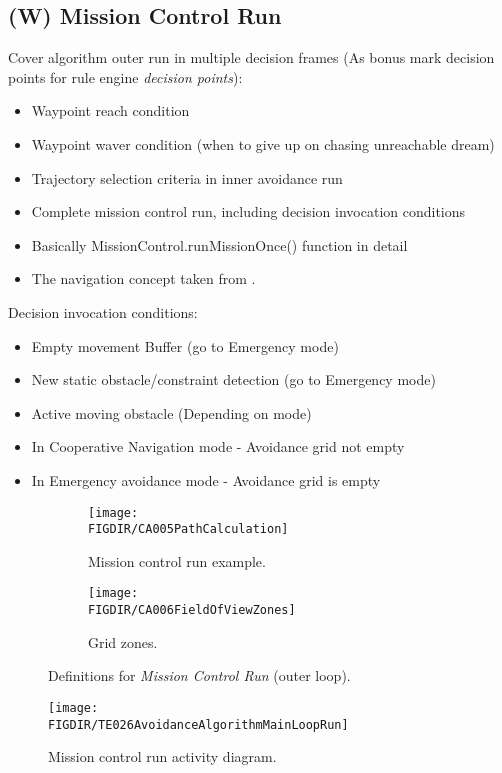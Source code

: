 \subsection{(W) Mission Control Run}\label{s:missionControlRun}
    \noindent Cover algorithm outer run in multiple decision frames (As bonus mark decision points for rule engine \emph{decision points}):
    \begin{itemize}
        \item Waypoint reach condition
        \item Waypoint waver condition (when to give up on chasing unreachable dream)
        \item Trajectory selection criteria in inner avoidance run
        \item Complete mission control run, including decision invocation conditions
        \item Basically MissionControl.runMissionOnce() function in detail
		\item The navigation concept taken from \cite{sabatini2014navigation,Sabatini2014}.
    \end{itemize}
    \noindent Decision invocation conditions:
    \begin{itemize}
        \item Empty movement Buffer (go to Emergency mode)
        \item New static obstacle/constraint detection (go to Emergency mode)
        \item Active moving obstacle (Depending on mode)
        \item In Cooperative Navigation mode - Avoidance grid not empty
        \item In Emergency avoidance mode - Avoidance grid is empty
    \end{itemize}
    \begin{figure}[H]
	    \centering
        \begin{subfigure}{0.48\textwidth}
            \texttt{[image: \\FIGDIR/CA005PathCalculation]}
            \caption{Mission control run example.}
            \label{fig:missionControlRunExample}
        \end{subfigure}
        \begin{subfigure}{0.48\textwidth}
            \texttt{[image: \\FIGDIR/CA006FieldOfViewZones]} 
            \caption{Grid zones.}
            \label{fig:gridZonesMissionControl}
        \end{subfigure}
        \caption{Definitions for \emph{Mission Control Run} (outer loop).}
        \label{fig:definitionsForMissionControlRun}
    \end{figure}
    
    \begin{figure}[H]
        \centering
        \texttt{[image: \\FIGDIR/TE026AvoidanceAlgorithmMainLoopRun]}
        \caption{Mission control run activity diagram.}
        \label{fig:missionControlRunActivityDiagram}
    \end{figure}

